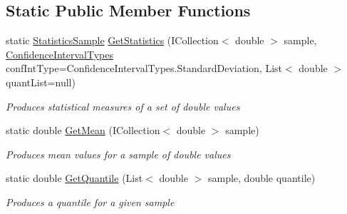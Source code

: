 \subsection*{Static Public Member Functions}
\begin{DoxyCompactItemize}
\item 
static \hyperlink{class_simulation_core_1_1_math_tool_1_1_statistics_1_1_statistics_sample}{Statistics\+Sample} \hyperlink{class_simulation_core_1_1_math_tool_1_1_distributions_1_1_distributions_a7b8b178da6e23d1b3541c3e8f4d130d6}{Get\+Statistics} (I\+Collection$<$ double $>$ sample, \hyperlink{namespace_simulation_core_1_1_math_tool_1_1_distributions_a4c9ae1b703094a62fce6e2b2415e1122}{Confidence\+Interval\+Types} conf\+Int\+Type=Confidence\+Interval\+Types.\+Standard\+Deviation, List$<$ double $>$ quant\+List=null)
\begin{DoxyCompactList}\small\item\em Produces statistical measures of a set of double values \end{DoxyCompactList}\item 
static double \hyperlink{class_simulation_core_1_1_math_tool_1_1_distributions_1_1_distributions_a32e1aa7d1ca650c5a68740b5f991e13a}{Get\+Mean} (I\+Collection$<$ double $>$ sample)
\begin{DoxyCompactList}\small\item\em Produces mean values for a sample of double values \end{DoxyCompactList}\item 
static double \hyperlink{class_simulation_core_1_1_math_tool_1_1_distributions_1_1_distributions_a6791cb0dedd3e8615e6c89a4d7fd6297}{Get\+Quantile} (List$<$ double $>$ sample, double quantile)
\begin{DoxyCompactList}\small\item\em Produces a quantile for a given sample \end{DoxyCompactList}\end{DoxyCompactItemize}
